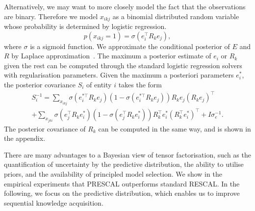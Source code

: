 Alternatively, we may want to more closely model the fact that the observations are binary.
Therefore we model $x_{ikj}$ as a binomial distributed random variable whose
probability is determined by logistic regression.
\[
p(x_{ikj}=1) = \sigma(e_i^{\top} R_k e_j),
\]
where $\sigma$ is a sigmoid function.
We approximate the conditional posterior of
$E$ and $R$ by Laplace approximation~\cite{bishop2006pattern}. The maximum a
posterior estimate of $e_i$ or $R_k$ given the rest can be computed through the
standard logistic regression solvers with regularisation parameters. Given the
maximum a posteriori parameters $e_i^*$, the posterior covariance $S_i$ of entity
$i$ takes the form
\begin{align*}
S_i^{-1} = \sum_{x_{ikj}} \sigma(e_{i}^{*\top} R_k e_{j}) (1 - \sigma(e_{i}^{*\top} R_k e_{j})) R_k
e_{j}(R_k e_{j})^\top\\
 + \sum_{x_{jki}} \sigma(e_{j}^{\top} R_k e_{i}^*) ( 1- \sigma(e_{j}^{\top} R_k e_{i}^*)) R_k^\top e^*_{i}(R_k^\top e^*_{i})^\top + I\sigma_e^{-1}
.
\end{align*}
The posterior covariance of $R_k$ can be computed in the same way, and is shown in the appendix.

There are many advantages to a Bayesian view of tensor factorisation, such as
the quantification of uncertainty by the predictive distribution,
the ability to utilise priors, and
the availability of principled model selection.
We show in the empirical experiments that PRESCAL outperforms standard RESCAL.
In the following, we focus on the predictive distribution, which enables us to
improve sequential knowledge acquisition.
